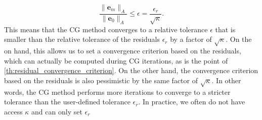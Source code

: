 \[
  \frac{\|\mathbf{e}_m\|_A}{\|\mathbf{e}_0\|_A} \leq \epsilon = \frac{\epsilon_r}{\sqrt{\kappa}}.
\]
This means that the CG method converges to a relative tolerance $\epsilon$ that is smaller than the relative tolerance of the residuals $\epsilon_r$ by a factor of $\sqrt{\kappa}$. On the on hand, this allows us to set a convergence criterion based on the residuals, which can actually be computed during CG iterations, as is the point of \cref{th:residual_convergence_criterion}. On the other hand, the convergence criterion based on the residuals is also pessimistic by the same factor of $\sqrt{\kappa}$. In other words, the CG method performs more iterations to converge to a stricter tolerance than the user-defined tolerance $\epsilon_r$. In practice, we often do not have access $\kappa$ and can only set $\epsilon_r$

